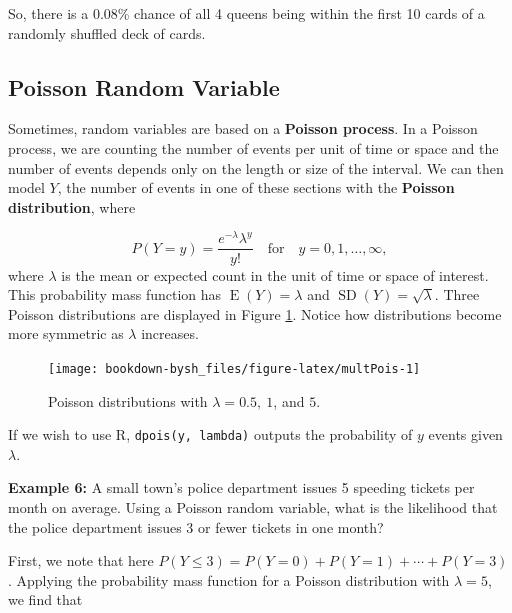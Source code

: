 \documentclass[
]{krantz}
\newcommand{\E}{\operatorname{E}}
\newcommand{\SD}{\operatorname{SD}}
\begin{document}
So, there is a 0.08\% chance of all 4 queens being within the first 10 cards of a randomly shuffled deck of cards.

\hypertarget{poisson-random-variable}{%
\subsection{Poisson Random Variable}\label{poisson-random-variable}}

Sometimes, random variables are based on a \textbf{Poisson process}.  In a Poisson process, we are counting the number of events per unit of time or space and the number of events depends only on the length or size of the interval.
We can then model \(Y\), the number of events in one of these sections with the \textbf{Poisson distribution},  where

\begin{equation}
P(Y=y) = \frac{e^{-\lambda}\lambda^y}{y!} \quad \textrm{for} \quad y = 0, 1, \ldots, \infty,
\label{eq:poissRV}
\end{equation}
where \(\lambda\) is the mean or expected count in the unit of time or space of interest.
This probability mass function has \(\E(Y) = \lambda\) and \(\SD(Y) = \sqrt{\lambda}\). Three Poisson distributions are displayed in Figure \ref{fig:multPois}. Notice how distributions become more symmetric as \(\lambda\) increases.



\begin{figure}

{\centering \texttt{[image: bookdown-bysh\_files/figure-latex/multPois-1]} 

}

\caption{Poisson distributions with \(\lambda = 0.5,\ 1\), and \(5\).}\label{fig:multPois}
\end{figure}

If we wish to use R, \texttt{dpois(y,\ lambda)} outputs the probability of \(y\) events given \(\lambda\).

\textbf{Example 6:} A small town's police department issues 5 speeding tickets per month on average. Using a Poisson random variable, what is the likelihood that the police department issues 3 or fewer tickets in one month?

First, we note that here \(P(Y \le 3) = P(Y=0) + P(Y=1) + \cdots + P(Y=3)\). Applying the probability mass function for a Poisson distribution with \(\lambda = 5\), we find that
\end{document}
